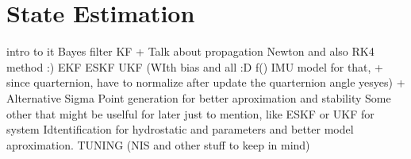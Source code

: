 \section{State Estimation}

intro to it
Bayes filter
KF + Talk about propagation Newton and also RK4 method :)
EKF
ESKF
UKF (WIth bias and all :D f() IMU model for that, + since quarternion, have to normalize after update the quarternion angle yesyes) + Alternative Sigma Point generation for better aproximation and stability
Some other that might be uselful for later just to mention, like ESKF or UKF for system Idtentification for hydrostatic and parameters and better model aproximation.
TUNING (NIS and other stuff to keep in mind)
